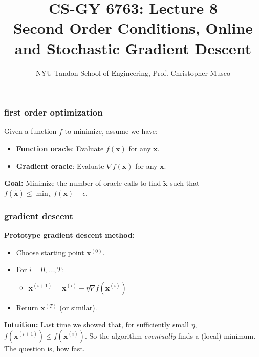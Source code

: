\documentclass[compress]{beamer}
\title{CS-GY 6763: Lecture 8 \\ Second Order Conditions, Online and Stochastic Gradient Descent}
\author{NYU Tandon School of Engineering, Prof. Christopher Musco}
\date{}
\newcommand{\bv}[1]{\mathbf{#1}}
\begin{document}
\begin{frame}
	\titlepage 
\end{frame}


\begin{frame}
	\frametitle{first order optimization}
	Given a function $f$ to minimize, assume we have:
	\begin{itemize}
		\item \textbf{Function oracle}: Evaluate $f(\bv{x})$ for any $\bv{x}$. 
		\item \textbf{Gradient oracle}: Evaluate $\nabla f(\bv{x})$ for any $\bv{x}$.
	\end{itemize}
	\textbf{Goal:} Minimize the number of oracle calls to find $\tilde{\bv{x}}$ such that $f(\tilde{\bv{x}}) \leq \min_{\bv{x}}f(\bv{x}) + \epsilon$. 
\end{frame}

\begin{frame}
	\frametitle{gradient descent}
	\textbf{Prototype gradient descent method:}
	\begin{itemize}
		\item Choose starting point $\bv{x}^{(0)}$.
		\item For $i = 0,\ldots, T$:
		\begin{itemize}
			\item $\bv{x}^{(i+1)} = \bv{x}^{(i)} - \eta \nabla f(\bv{x}^{(i)})$
		\end{itemize}
		\item Return $\bv{x}^{(T)}$ (or similar).
	\end{itemize}
	
	\textbf{Intuition:} Last time we showed that, for sufficiently small $\eta$, $f(\bv{x}^{(i+1)}) \leq f(\bv{x}^{(i)})$. So the algorithm \emph{eventually} finds a (local) minimum. The question is, how fast.
\end{frame}
\end{document}
